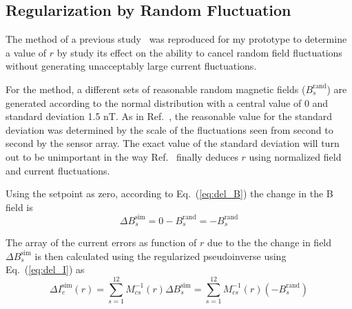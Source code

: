 




\subsection{Regularization by Random Fluctuation}\label{sec:mont}

The method of a previous study~\cite{bea} was reproduced for my prototype to determine a value of $r$ by study its effect on the ability to cancel random field fluctuations without generating unacceptably large current fluctuations.

For the method, a different sets of reasonable random magnetic fields ($B_s^{\text{rand}}$) are generated according to the normal distribution with a central value of 0 and standard deviation 1.5 nT. As in Ref.~\cite{bea}, the reasonable value for the standard deviation was determined by the scale of the fluctuations seen from second to second by the sensor array. The exact value of the standard deviation will turn out to be unimportant in the way Ref.~\cite{bea} finally deduces $r$ using normalized field and current fluctuations.

Using the setpoint as zero, according to Eq.~(\ref{eq:del_B}) the change in the B field is  
\begin{equation}\label{eq:del_Bs}
    \Delta B_s^{\text{sim}} = 0 - B_s^{\text{rand}}=-B_s^{\text{rand}}
\end{equation}

The array of the current errors  as function of $r$ due to the the change in field $\Delta B_s^{\text{sim}}$ is then calculated using the regularized pseudoinverse using Eq.~(\ref{eq:del_I}) as
\begin{equation}\label{eq:del_Is}
    \Delta I_c^{\text{sim}}(r) =\sum_{s=1}^{12} M^{-1}_{cs}(r) \Delta B_s^{\text{sim}}=\sum_{s=1}^{12} M^{-1}_{cs}(r) (-B_s^{\text{rand}})
\end{equation}

